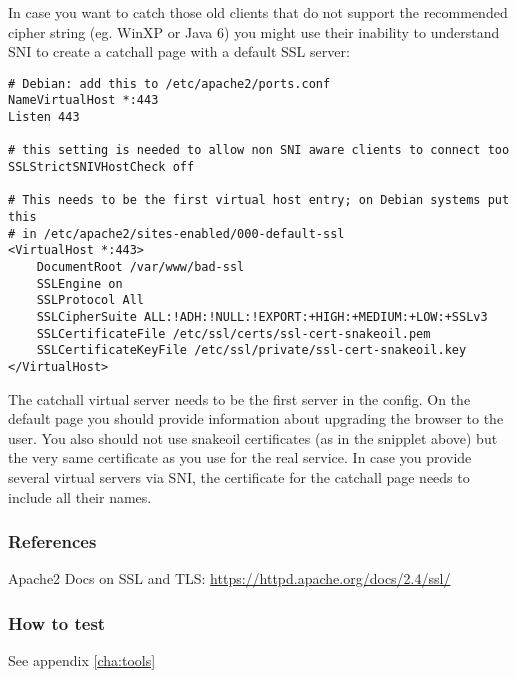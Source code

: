 In case you want to catch those old clients that do not support the recommended
cipher string (eg. WinXP or Java 6) you might use their inability to understand
SNI to create a catchall page with a default SSL server:

\begin{lstlisting}
# Debian: add this to /etc/apache2/ports.conf
NameVirtualHost *:443
Listen 443

# this setting is needed to allow non SNI aware clients to connect too
SSLStrictSNIVHostCheck off

# This needs to be the first virtual host entry; on Debian systems put this
# in /etc/apache2/sites-enabled/000-default-ssl
<VirtualHost *:443>
    DocumentRoot /var/www/bad-ssl
    SSLEngine on
    SSLProtocol All
    SSLCipherSuite ALL:!ADH:!NULL:!EXPORT:+HIGH:+MEDIUM:+LOW:+SSLv3
    SSLCertificateFile /etc/ssl/certs/ssl-cert-snakeoil.pem
    SSLCertificateKeyFile /etc/ssl/private/ssl-cert-snakeoil.key
</VirtualHost>
\end{lstlisting}

The catchall virtual server needs to be the first server in the config. On the
default page you should provide information about upgrading the browser to the
user. You also should not use snakeoil certificates (as in the snipplet above)
but the very same certificate as you use for the real service. In case you
provide several virtual servers via SNI, the certificate for the catchall page
needs to include all their names.


\subsubsection{References}
\begin{itemize*}
  \item Apache2 Docs on SSL and TLS: \url{https://httpd.apache.org/docs/2.4/ssl/}
\end{itemize*}


\subsubsection{How to test}
See appendix \ref{cha:tools}



